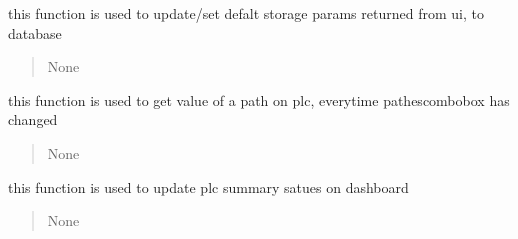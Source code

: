 \documentclass[letterpaper,10pt,english]{sphinxmanual}
\begin{document}
\begin{savenotes}
\begin{fulllineitems}
\begin{savenotes}\begin{fulllineitems}
\label{\detokenize{setting/setting_api:oxin.setting_api.API.update_camera_live_storage_parms}}
\pysigstartsignatures
{}
\pysigstopsignatures
\sphinxAtStartPar
this function is used to update/set defalt storage params returned from ui, to database
\begin{quote}\begin{description}
\sphinxAtStartPar
None

\end{description}\end{quote}

\end{fulllineitems}\end{savenotes}


\begin{savenotes}\begin{fulllineitems}
\label{\detokenize{setting/setting_api:oxin.setting_api.API.update_path_plc}}
\pysigstartsignatures
{}
\pysigstopsignatures
\sphinxAtStartPar
this function is used to get value of a path on plc, everytime pathes\sphinxhyphen{}combobox has changed
\begin{quote}\begin{description}
\sphinxAtStartPar
None

\end{description}\end{quote}

\end{fulllineitems}\end{savenotes}


\begin{savenotes}\begin{fulllineitems}
\label{\detokenize{setting/setting_api:oxin.setting_api.API.update_plc_dashboard_parms}}
\pysigstartsignatures
{}
\pysigstopsignatures
\sphinxAtStartPar
this function is used to update plc summary satues on dashboard
\begin{quote}\begin{description}
\sphinxAtStartPar
None


\end{description}
\end{quote}
\end{fulllineitems}
\end{savenotes}
\end{fulllineitems}
\end{savenotes}
\end{document}
